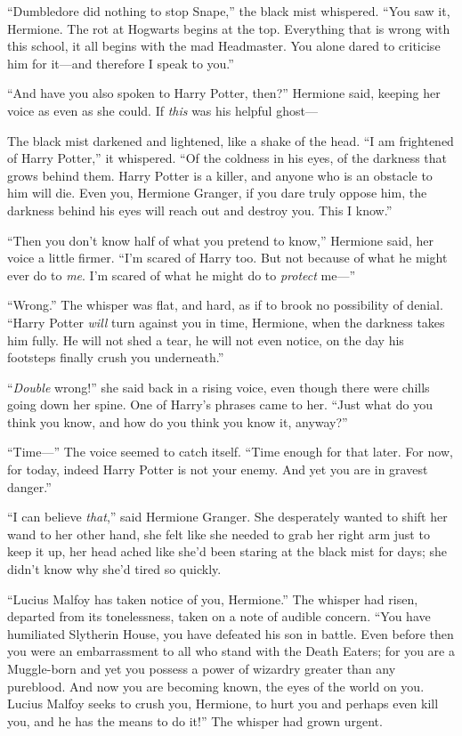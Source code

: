 “Dumbledore did nothing to stop Snape,” the black mist whispered. “You saw it, Hermione. The rot at Hogwarts begins at the top. Everything that is wrong with this school, it all begins with the mad Headmaster. You alone dared to criticise him for it—and therefore I speak to you.”

“And have you also spoken to Harry Potter, then?” Hermione said, keeping her voice as even as she could. If \emph{this} was his helpful ghost—

The black mist darkened and lightened, like a shake of the head. “I am frightened of Harry Potter,” it whispered. “Of the coldness in his eyes, of the darkness that grows behind them. Harry Potter is a killer, and anyone who is an obstacle to him will die. Even you, Hermione Granger, if you dare truly oppose him, the darkness behind his eyes will reach out and destroy you. This I know.”

“Then you don’t know half of what you pretend to know,” Hermione said, her voice a little firmer. “I’m scared of Harry too. But not because of what he might ever do to \emph{me}. I’m scared of what he might do to \emph{protect} me—”

“Wrong.” The whisper was flat, and hard, as if to brook no possibility of denial. “Harry Potter \emph{will} turn against you in time, Hermione, when the darkness takes him fully. He will not shed a tear, he will not even notice, on the day his footsteps finally crush you underneath.”

“\emph{Double} wrong!” she said back in a rising voice, even though there were chills going down her spine. One of Harry’s phrases came to her. “Just what do you think you know, and how do you think you know it, anyway?”

“Time—” The voice seemed to catch itself. “Time enough for that later. For now, for today, indeed Harry Potter is not your enemy. And yet you are in gravest danger.”

“I can believe \emph{that},” said Hermione Granger. She desperately wanted to shift her wand to her other hand, she felt like she needed to grab her right arm just to keep it up, her head ached like she’d been staring at the black mist for days; she didn’t know why she’d tired so quickly.

“Lucius Malfoy has taken notice of you, Hermione.” The whisper had risen, departed from its tonelessness, taken on a note of audible concern. “You have humiliated Slytherin House, you have defeated his son in battle. Even before then you were an embarrassment to all who stand with the Death Eaters; for you are a Muggle-born and yet you possess a power of wizardry greater than any pureblood. And now you are becoming known, the eyes of the world on you. Lucius Malfoy seeks to crush you, Hermione, to hurt you and perhaps even kill you, and he has the means to do it!” The whisper had grown urgent.

